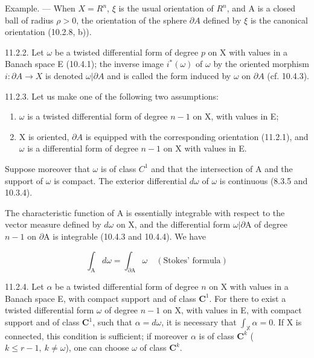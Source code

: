 Example. --- When \(X = R^{n}\), \(\xi\) is the usual orientation of \(R^{n}\), and A is a closed ball of radius \(\rho>0\), the orientation of the sphere \(\partial A\) defined by \(\xi\) is the canonical orientation (10.2.8, b)).

11.2.2. Let \(\omega\) be a twisted differential form of degree \(p\) on X with values in a Banach space E (10.4.1); the inverse image \(i^{*}(\omega)\) of \(\omega\) by the oriented morphism \(i\colon\partial A\to X\) is denoted \(\omega|\partial A\) and is called the form induced by \(\omega\) on \(\partial A\) (cf. 10.4.3).

11.2.3. Let us make one of the following two assumptions:

\begin{enumerate}
\def\labelenumi{(\roman{enumi})}
\tightlist
\item
  \(\omega\) is a twisted differential form of degree \(n - 1\) on X, with values in E;
\item
  X is oriented, \(\partial A\) is equipped with the corresponding orientation (11.2.1), and \(\omega\) is a differential form of degree \(n - 1\) on X with values in E.
\end{enumerate}

Suppose moreover that \(\omega\) is of class \(C^{1}\) and that the intersection of A and the support of \(\omega\) is compact. The exterior differential \(d\omega\) of \(\omega\) is continuous (8.3.5 and 10.3.4).

The characteristic function of A is essentially integrable with respect to the vector measure defined by \(d\omega\) on X, and the differential form \(\omega|\partial\mathrm{A}\) of degree \(n-1\) on \(\partial\mathrm{A}\) is integrable (10.4.3 and 10.4.4). We have

\[
\int_ {\mathrm{A}} d \omega = \int_ {\partial \mathrm{A}} \omega \quad (\text{Stokes' formula})
\]

11.2.4. Let \(\alpha\) be a twisted differential form of degree \(n\) on X with values in a Banach space E, with compact support and of class \(\mathbf{C}^1\). For there to exist a twisted differential form \(\omega\) of degree \(n - 1\) on X, with values in E, with compact support and of class \(\mathbf{C}^1\), such that \(\alpha = d\omega\), it is necessary that \(\int_{\mathbb{X}} \alpha = 0\). If X is connected, this condition is sufficient; if moreover \(\alpha\) is of class \(\mathbf{C}^k\) (\(k\leqslant r-1,\ k\neq\omega\)), one can choose \(\omega\) of class \(\mathbf{C}^k\).

